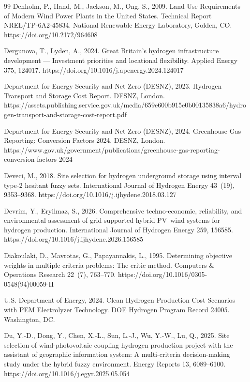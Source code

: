 \documentclass[preprint,12pt,authoryear]{elsarticle}
\begin{document}
\begin{thebibliography}{99}
Denholm, P., Hand, M., Jackson, M., Ong, S., 2009. Land-Use Requirements of Modern Wind Power Plants in the United States. Technical Report NREL/TP-6A2-45834. National Renewable Energy Laboratory, Golden, CO. https://doi.org/10.2172/964608

Dergunova, T., Lyden, A., 2024. Great Britain's hydrogen infrastructure development --- Investment priorities and locational flexibility. Applied Energy 375, 124017. https://doi.org/10.1016/j.apenergy.2024.124017

Department for Energy Security and Net Zero (DESNZ), 2023. Hydrogen Transport and Storage Cost Report. DESNZ, London. https://assets.publishing.service.gov.uk/media/659e600b915e0b00135838a6/hydrogen-transport-and-storage-cost-report.pdf

Department for Energy Security and Net Zero (DESNZ), 2024. Greenhouse Gas Reporting: Conversion Factors 2024. DESNZ, London. https://www.gov.uk/government/publications/greenhouse-gas-reporting-conversion-factors-2024

Deveci, M., 2018. Site selection for hydrogen underground storage using interval type-2 hesitant fuzzy sets. International Journal of Hydrogen Energy 43~(19), 9353--9368. https://doi.org/10.1016/j.ijhydene.2018.03.127

Devrim, Y., Eryilmaz, S., 2026. Comprehensive techno-economic, reliability, and environmental assessment of grid-supported hybrid PV--wind systems for hydrogen production. International Journal of Hydrogen Energy 259, 156585. https://doi.org/10.1016/j.ijhydene.2026.156585

Diakoulaki, D., Mavrotas, G., Papayannakis, L., 1995. Determining objective weights in multiple criteria problems: The critic method. Computers \& Operations Research 22~(7), 763--770. https://doi.org/10.1016/0305-0548(94)00059-H

U.S. Department of Energy, 2024. Clean Hydrogen Production Cost Scenarios with PEM Electrolyzer Technology. DOE Hydrogen Program Record 24005. Washington, DC.

Du, Y.-D., Dong, Y., Chen, X.-L., Sun, L.-J., Wu, Y.-W., Lu, Q., 2025. Site selection of wind-photovoltaic coupling hydrogen production project with the assistant of geographic information system: A multi-criteria decision-making study under the hybrid fuzzy environment. Energy Reports 13, 6089--6100. https://doi.org/10.1016/j.egyr.2025.05.054


\end{thebibliography}
\end{document}
